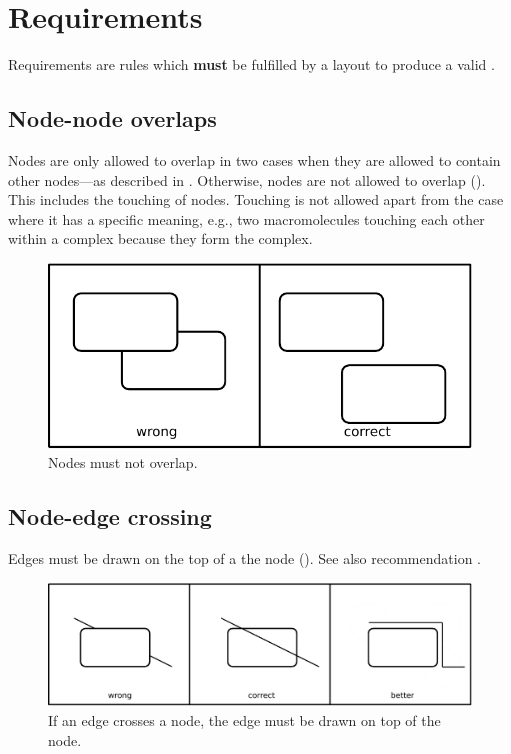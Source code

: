 \section{Requirements}

Requirements are rules which \textbf{must} be fulfilled by a layout to
produce a valid \PDm.

\subsection{Node-node overlaps}

Nodes are only allowed to overlap in two cases when they are allowed to contain other nodes---as described in . Otherwise, nodes are not allowed to overlap (). This includes the
touching of nodes. Touching is not allowed apart from the case where
it has a specific meaning, e.g., two macromolecules touching each
other within a complex because they form the complex.

\begin{figure}[htb]
  \centering
  \includegraphics[scale=0.8]{images/build/layout_node_node.pdf}
  \caption{Nodes must not overlap.}\label{fig:layout1}
\end{figure}

\subsection{Node-edge crossing}\label{crosEdNoRe}

Edges must be drawn on the top of a the node (). See also recommendation .

\begin{figure}[htb]
  \centering
  \includegraphics[scale=0.8]{images/build/layout_node_edge.pdf}
  \caption{If an edge crosses a node, the edge must be drawn on top
  of the node.}\label{fig:layout2}
\end{figure}

